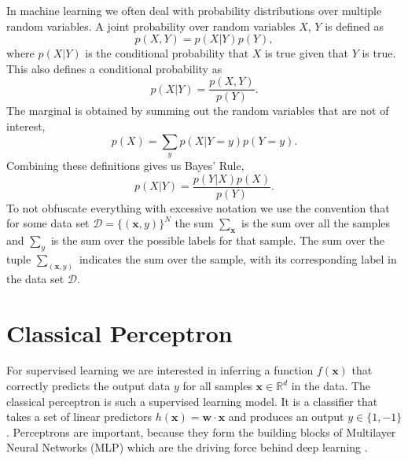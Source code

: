 \noindent In machine learning we often deal with probability distributions over multiple random variables. A joint probability over random variables $X$, $Y$ is defined as 
    \begin{equation*}
        p(X,Y) = p(X|Y)p(Y),
    \end{equation*}
where  $p(X|Y)$ is the conditional probability that $X$ is true given that $Y$ is true. This also defines a conditional probability as 
\begin{equation*}
    p(X|Y) = \frac{p(X,Y) }{p(Y)}.
\end{equation*}
The marginal is obtained by summing out the random variables that are not of interest,
    \begin{equation*}
        p(X) = \sum_y p(X|Y=y)p(Y=y).
    \end{equation*}
Combining these definitions gives us Bayes' Rule,
    \begin{equation*}
        p(X|Y) = \frac{p(Y|X)p(X) }{p(Y)}.
    \end{equation*}
To not obfuscate everything with excessive notation we use the convention that for some data set $\mathcal{D} = \{(\mathbf{x}, y)\}^N$ the sum $\sum_\mathbf{x}$ is the sum over all the samples and $\sum_y$ is the sum over the possible labels for that sample. The sum over the tuple $\sum_{(\mathbf{x}, y)}$ indicates the sum over the sample, with its corresponding label in the data set $\mathcal{D}$.

\section{Classical Perceptron}\label{sec:cl_percp}

For supervised learning we are interested in inferring a function $f(\mathbf{x})$ that correctly predicts the output data $y$ for all samples $\mathbf{x} \in \mathbb{R}^d$ in the data. The classical perceptron is such a supervised learning model. It is a classifier that takes a set of linear predictors $h(\mathbf{x}) = \mathbf{w}\cdot \mathbf{x}$ and produces an output $y\in\{1,-1\}$. Perceptrons are important, because they form the building blocks of Multilayer Neural Networks (MLP) which are the driving force behind deep learning \cite{LeCun2015}.\newline

